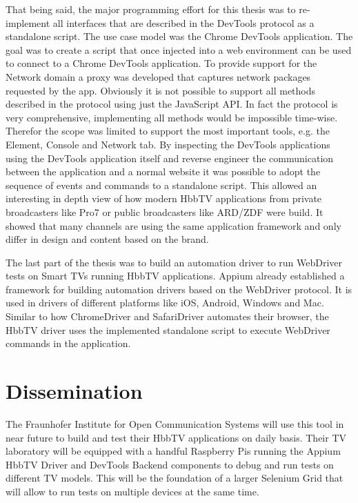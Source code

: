 That being said, the major programming effort for this thesis was to re-implement all interfaces that are described in the DevTools protocol as a standalone script. The use case model was the Chrome DevTools application. The goal was to create a script that once injected into a web environment can be used to connect to a Chrome DevTools application. To provide support for the Network domain a proxy was developed that captures network packages requested by the app. Obviously it is not possible to support all methods described in the protocol using just the JavaScript API. In fact the protocol is very comprehensive, implementing all methods would be impossible time-wise. Therefor the scope was limited to support the most important tools, e.g. the Element, Console and Network tab. By inspecting the DevTools applications using the DevTools application itself and reverse engineer the communication between the application and a normal website it was possible to adopt the sequence of events and commands to a standalone script. This allowed an interesting in depth view of how modern HbbTV applications from private broadcasters like Pro7 or public broadcasters like ARD/ZDF were build. It showed that many channels are using the same application framework and only differ in design and content based on the brand.

The last part of the thesis was to build an automation driver to run WebDriver tests on Smart TVs running HbbTV applications. Appium already established a framework for building automation drivers based on the WebDriver protocol. It is used in drivers of different platforms like iOS, Android, Windows and Mac. Similar to how ChromeDriver and SafariDriver automates their browser, the HbbTV driver uses the implemented standalone script to execute WebDriver commands in the application.

\section{Dissemination\label{sec:dissemination}}


The Fraunhofer Institute for Open Communication Systems will use this tool in near future to build and test their HbbTV applications on daily basis. Their TV laboratory will be equipped with a handful Raspberry Pis running the Appium HbbTV Driver and DevTools Backend components to debug and run tests on different TV models. This will be the foundation of a larger Selenium Grid that will allow to run tests on multiple devices at the same time.


